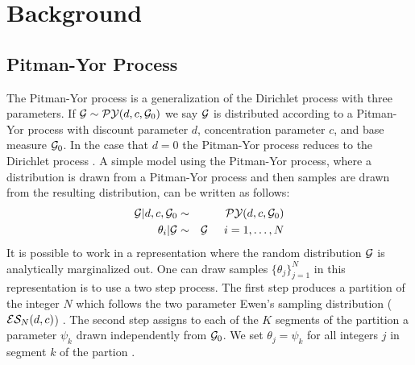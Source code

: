 
\section{Background}
\label{basicModel}

\subsection{Pitman-Yor Process}

The Pitman-Yor process is a generalization of the Dirichlet process with three parameters.   If $\G \sim \PY(d,c,\G_0)$ we say $\G$ is distributed according to a Pitman-Yor process with discount parameter $d$, concentration parameter $c$, and base measure $\G_0$. In the case that $d = 0$ the Pitman-Yor process reduces to the Dirichlet process \cite{Pitman1997}.  A simple model using the Pitman-Yor process, where a distribution is drawn from a Pitman-Yor process and then samples are drawn from the resulting distribution, can be written as follows:
%
\begin{eqnarray*}
\G | d,c,\G_0 &\sim& \PY(d,c,\G_0)\\
\theta_i | \G &\sim& \G  \hspace{.5cm} i = 1, \dots, N
\end{eqnarray*}
%
It is possible to work in a representation where the random distribution $\G$ is analytically marginalized out.  One can draw samples $\{ \theta_j \}_{j = 1}^N$ in this representation is to use a two step process.  The first step produces a partition of the integer $N$ which follows the two parameter Ewen's sampling distribution ($\ES_N(d,c)$) \cite{Ewens1995}.  The second step assigns to each of the $K$ segments of the partition a parameter $\psi_k$ drawn independently from $\G_0$.  We set $\theta_j = \psi_k$ for all integers $j$ in segment $k$ of the partion \cite{Blackwell1973}.

